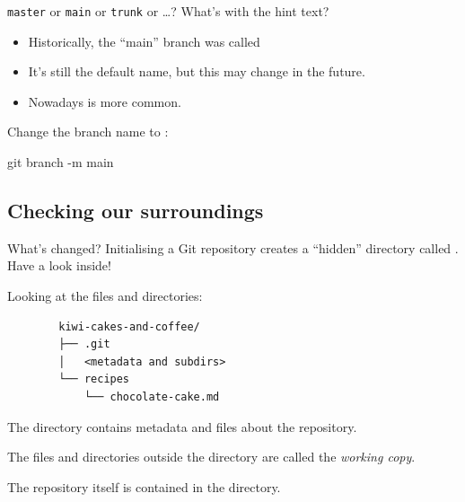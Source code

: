 \begin{frame}[fragile]{\texttt{master} or \texttt{main} or \texttt{trunk} or \ldots?}
    What's with the hint text?
    \begin{itemize}
        \item Historically, the ``main'' branch was called 
        \item It's still the default name, but this may change in the
            future.
        \item Nowadays  is more common.
    \end{itemize}

    Change the branch name to :
    \begin{shellcode}
        git branch -m main
    \end{shellcode}
\end{frame}

\subsection{Checking our surroundings}

\begin{frame}[fragile]{What's changed?}
    Initialising a Git repository creates a ``hidden'' directory called
    .  Have a look inside!

    Looking at the files and directories:
    \begin{verbatim}
        kiwi-cakes-and-coffee/
        ├── .git
        │   <metadata and subdirs>
        └── recipes
            └── chocolate-cake.md
    \end{verbatim}

    The  directory contains metadata and files about the
    repository.

    The files and directories outside the  directory are called
    the \emph{working copy}.

    The repository itself is contained in the  directory.
\end{frame}

